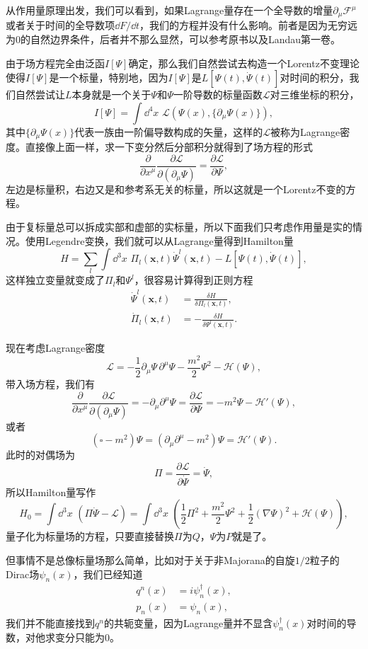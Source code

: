 \documentclass[9pt]{extbook}
\theoremstyle{plain}%
\begin{document}
从作用量原理出发，我们可以看到，如果Lagrange量存在一个全导数的增量$\partial_\mu \mathscr{F}^\mu$或者关于时间的全导数项$\dd F/\dd t$，我们的方程并没有什么影响。前者是因为无穷远为0的自然边界条件，后者并不那么显然，可以参考原书以及Landau第一卷。

由于场方程完全由泛函$I[\Psi]$确定，那么我们自然尝试去构造一个Lorentz不变理论使得$I[\Psi]$是一个标量，特别地，因为$I[\Psi]$是$L[\Psi(t),\dot{\Psi}(t)]$对时间的积分，我们自然尝试让$L$本身就是一个关于$\Psi$和$\Psi$一阶导数的标量函数$\mathscr{L}$对三维坐标的积分，
\[
	I[\Psi]=\int \dd^4x\,\, \mathscr{L}\left(\Psi(x),\{\partial_\mu \Psi(x)\}\right),
\]
其中$\{\partial_\mu \Psi(x)\}$代表一族由一阶偏导数构成的矢量，这样的$\mathscr{L}$被称为Lagrange密度。直接像上面一样，求一下变分然后分部积分就得到了场方程的形式
\[
	\frac{\partial}{\partial x^\mu}\frac{\partial \mathscr{L}}{\partial \left(\partial_\mu \Psi\right)}=\frac{\partial \mathscr{L}}{\partial \Psi},
\]
左边是标量积，右边又是和参考系无关的标量，所以这就是一个Lorentz不变的方程。

由于复标量总可以拆成实部和虚部的实标量，所以下面我们只考虑作用量是实的情况。使用Legendre变换，我们就可以从Lagrange量得到Hamilton量
\[
	H=\sum_l \int \dd^3 x \,\, \Pi_l(\mathbf{x},t)\dot{\Psi}^l(\mathbf{x},t)-L[\Psi(t),\dot{\Psi}(t)],
\]
这样独立变量就变成了$\Pi_l$和$\Psi^l$，很容易计算得到正则方程
\[
\begin{split}
	\dot{\Psi}^l(\mathbf{x},t)&=\frac{\delta H}{\delta \Pi_l(\mathbf{x},t)},\\
	\dot{\Pi}_l(\mathbf{x},t)&=-\frac{\delta H}{\delta \Psi^l(\mathbf{x},t)}.
\end{split}
\]

现在考虑Lagrange密度
\[
	\mathscr{L}=-\frac{1}{2}\partial_\mu\Psi\,\partial^\mu\Psi-\frac{m^2}{2}\Psi^2-\mathscr{H}(\Psi),
\]
带入场方程，我们有
\[
	\frac{\partial}{\partial x^\mu}\frac{\partial \mathscr{L}}{\partial \left(\partial_\mu \Psi\right)}=-\partial_\mu\partial^\mu\Psi=\frac{\partial \mathscr{L}}{\partial \Psi}=-m^2\Psi-\mathscr{H}'(\Psi),
\]
或者
\[
	(\square-m^2)\Psi=(\partial_\mu\partial^\mu-m^2)\Psi=\mathscr{H}'(\Psi).
\]
此时的对偶场为
\[
	\Pi=\frac{\partial \mathscr{L}}{\partial \dot{\Psi}}=\dot{\Psi},
\]
所以Hamilton量写作
\[
	H_0=\int \dd^3 x\,\,(\Pi\dot{\Psi}-\mathscr{L})=\int \dd^3 x\,\,\left(\frac{1}{2}\Pi^2+\frac{m^2}{2}\Psi^2+\frac{1}{2}(\nabla \Psi)^2+\mathscr{H}(\Psi)\right),
\]
量子化为标量场的方程，只要直接替换$\Pi$为$Q$，$\Psi$为$P$就是了。

但事情不是总像标量场那么简单，比如对于关于非Majorana的自旋$1/2$粒子的Dirac场$\psi_n(x)$，我们已经知道
\[
	\begin{split}
	q^n(x)&=i\psi^\dag_n(x),\\
	p_n(x)&=\psi_n(x),
	\end{split}
\]
我们并不能直接找到$q^n$的共轭变量，因为Lagrange量并不显含$\psi^\dag_n(x)$对时间的导数，对他求变分只能为0。
\end{document}
